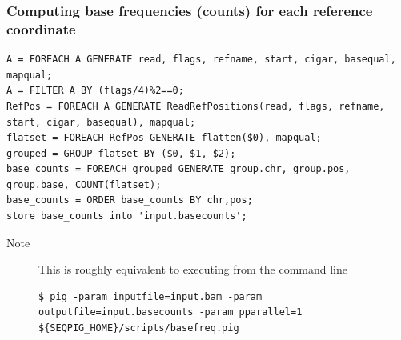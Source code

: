  \subsubsection{Computing base frequencies (counts) for each reference coordinate}
\begin{lstlisting}
A = FOREACH A GENERATE read, flags, refname, start, cigar, basequal, mapqual;
A = FILTER A BY (flags/4)%2==0;
RefPos = FOREACH A GENERATE ReadRefPositions(read, flags, refname, start, cigar, basequal), mapqual;
flatset = FOREACH RefPos GENERATE flatten($0), mapqual;
grouped = GROUP flatset BY ($0, $1, $2);
base_counts = FOREACH grouped GENERATE group.chr, group.pos, group.base, COUNT(flatset);
base_counts = ORDER base_counts BY chr,pos;
store base_counts into 'input.basecounts';
\end{lstlisting}
\begin{description}
	\item[Note] This is roughly equivalent to executing from the command line
\begin{lstlisting}
$ pig -param inputfile=input.bam -param outputfile=input.basecounts -param pparallel=1 ${SEQPIG_HOME}/scripts/basefreq.pig 
\end{lstlisting}
\end{description}

